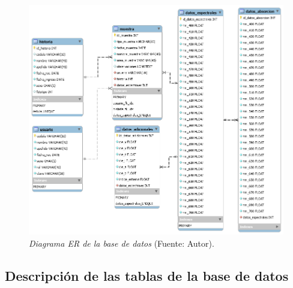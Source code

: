 	\begin{figure}[H]
		\centering
		\includegraphics[scale=.4]{img/diagramaER.png}
			\caption[Diagrama ER de la base de datos]{\textit{Diagrama ER de la base de datos} (Fuente: Autor).}
	\end{figure}
	
	\subsection{Descripci\'{o}n de las tablas de la base de datos}
	
